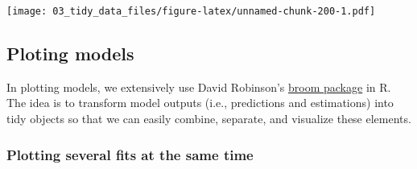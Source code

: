\documentclass[
]{book}
\begin{document}
\texttt{[image: 03\_tidy\_data\_files/figure-latex/unnamed-chunk-200-1.pdf]}

\hypertarget{ploting-models}{%
\subsection{Ploting models}\label{ploting-models}}

In plotting models, we extensively use David Robinson's \href{https://cran.r-project.org/web/packages/broom/vignettes/broom.html}{broom package} in R. The idea is to transform model outputs (i.e., predictions and estimations) into tidy objects so that we can easily combine, separate, and visualize these elements.

\hypertarget{plotting-several-fits-at-the-same-time}{%
\subsubsection{Plotting several fits at the same time}\label{plotting-several-fits-at-the-same-time}}
\end{document}
